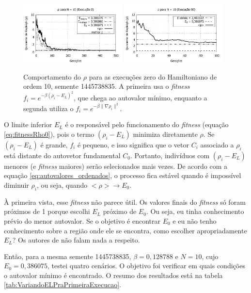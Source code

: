 	
	\begin{figure}[htbp]
		\centering
			\includegraphics[width=0.48\textwidth]{figs/resultados/fitnessEL/N-10_E-0_rho.pdf}
			\includegraphics[width=0.48\textwidth]{figs/resultados/fitnessGrad/N10_00_rho.pdf}
		\caption{Comportamento do $\rho$ para as execuções zero do Hamiltoniano de ordem 10, semente 1445738835. A primeira usa o \textit{fitness} $f_i = e^{-\beta(\rho_i - E_L)^2}$, que chega ao autovalor mínimo, enquanto a segunda utiliza o $f_i = e^{-\beta \| \nabla \rho_i \|^2}$.}
		\label{fig:N-10_E-0_rho_comparacao}
	\end{figure}	
	
	O limite inferior $E_L$ é o responsável pelo funcionamento do \emph{fitness} (equação \ref{eq:fitnessRho0}), pois o termo $(\rho_i - E_L)$ minimiza diretamente $\rho$. Se $(\rho_i - E_L)$ é grande, $f_i$ é pequeno, e isso significa que o vetor $C_i$ associado a $\rho_i$ está distante do autovetor fundamental $C_0$. Portanto, indivíduos com $(\rho_i - E_L)$ menores (e \emph{fitness} maiores) serão selecionados mais vezes. De acordo com a equação \ref{eq:autovalores_ordenados}, o processo fica estável quando é impossível diminuir $\rho_i$, ou seja, quando $<\rho> \rightarrow E_0$. 

	À primeira vista, esse \emph{fitness} não parece útil. Os valores finais do \emph{fitness} só foram próximos de 1 porque escolhi $E_L$ próximo de $E_0$. Ou seja, eu tinha conhecimento prévio do menor autovalor. Se o objetivo é encontrar $E_0$ e eu não tenho conhecimento sobre a região onde ele se encontra, como escolher apropriadamente $E_L$? Os autores de \cite{metodo2011} não falam nada a respeito.
	
	Então, para a mesma semente 1445738835, $\beta = 0,128788$ e $N = 10$, cujo $E_0 = 0,386075$, testei quatro cenários. O objetivo foi verificar em quais condições o autovalor mínimo é encontrado. O resumo dos resultados está na tabela \ref{tab:VariandoELPraPrimeiraExecucao}.
	
